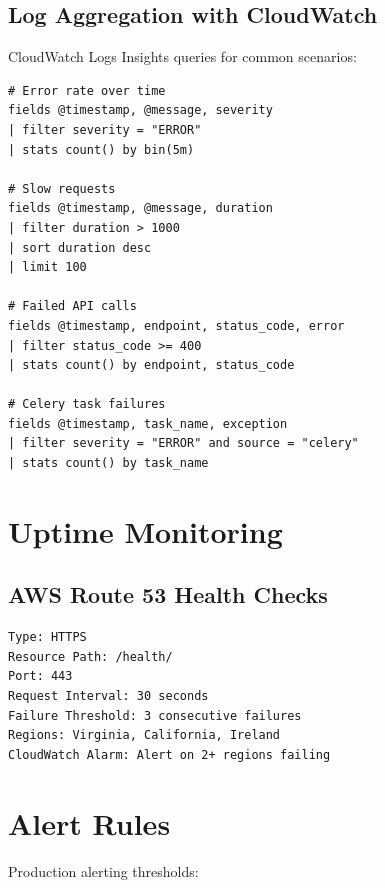 \documentclass{report}
\begin{document}
\subsection{Log Aggregation with CloudWatch}

CloudWatch Logs Insights queries for common scenarios:

\begin{lstlisting}[caption=CloudWatch Logs Insights Queries]
# Error rate over time
fields @timestamp, @message, severity
| filter severity = "ERROR"
| stats count() by bin(5m)

# Slow requests
fields @timestamp, @message, duration
| filter duration > 1000
| sort duration desc
| limit 100

# Failed API calls
fields @timestamp, endpoint, status_code, error
| filter status_code >= 400
| stats count() by endpoint, status_code

# Celery task failures
fields @timestamp, task_name, exception
| filter severity = "ERROR" and source = "celery"
| stats count() by task_name
\end{lstlisting}

\section{Uptime Monitoring}

\subsection{AWS Route 53 Health Checks}

\begin{lstlisting}[caption=Health Check Configuration]
Type: HTTPS
Resource Path: /health/
Port: 443
Request Interval: 30 seconds
Failure Threshold: 3 consecutive failures
Regions: Virginia, California, Ireland
CloudWatch Alarm: Alert on 2+ regions failing
\end{lstlisting}

\section{Alert Rules}

Production alerting thresholds:
\end{document}
